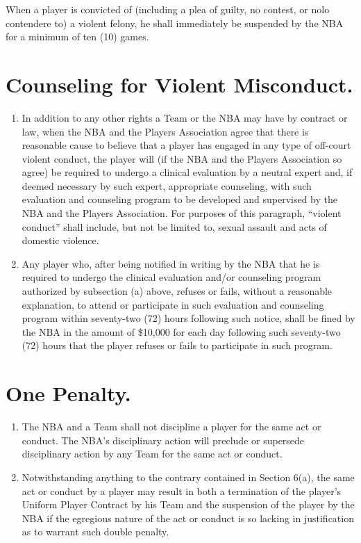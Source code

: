 \documentclass[
]{book}
\providecommand{\tightlist}{%
  \setlength{\itemsep}{0pt}\setlength{\parskip}{0pt}}
\begin{document}
When a player is convicted of (including a plea of guilty, no contest, or nolo contendere to) a violent felony, he shall immediately be suspended by the NBA for a minimum of ten (10) games.

\hypertarget{counseling-for-violent-misconduct.}{%
\section{Counseling for Violent Misconduct.}\label{counseling-for-violent-misconduct.}}

\begin{enumerate}
\def\labelenumi{(\alph{enumi})}
\tightlist
\item
  In addition to any other rights a Team or the NBA may have by contract or law, when the NBA and the Players Association agree that there is reasonable cause to believe that a player has engaged in any type of off-court violent conduct, the player will (if the NBA and the Players Association so agree) be required to undergo a clinical evaluation by a neutral expert and, if deemed necessary by such expert, appropriate counseling, with such evaluation and counseling program to be developed and supervised by the NBA and the Players Association. For purposes of this paragraph, ``violent conduct'' shall include, but not be limited to, sexual assault and acts of domestic violence.
\item
  Any player who, after being notified in writing by the NBA that he is required to undergo the clinical evaluation and/or counseling program authorized by subsection (a) above, refuses or fails, without a reasonable explanation, to attend or participate in such evaluation and counseling program within seventy-two (72) hours following such notice, shall be fined by the NBA in the amount of \$10,000 for each day following such seventy-two (72) hours that the player refuses or fails to participate in such program.
\end{enumerate}

\hypertarget{one-penalty.}{%
\section{One Penalty.}\label{one-penalty.}}

\begin{enumerate}
\def\labelenumi{(\alph{enumi})}
\tightlist
\item
  The NBA and a Team shall not discipline a player for the same act or conduct. The NBA's disciplinary action will preclude or supersede disciplinary action by any Team for the same act or conduct.
\item
  Notwithstanding anything to the contrary contained in Section 6(a), the same act or conduct by a player may result in both a termination of the player's Uniform Player Contract by his Team and the suspension of the player by the NBA if the egregious nature of the act or conduct is so lacking in justification as to warrant such double penalty.
\end{enumerate}
\end{document}
